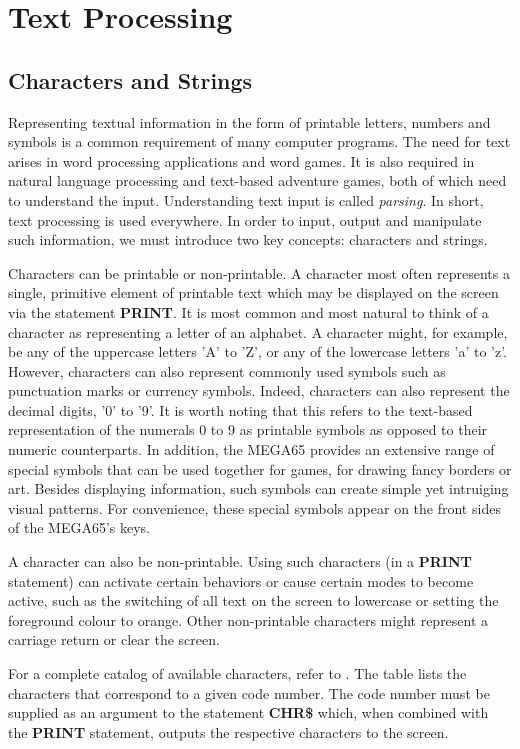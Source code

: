 \chapter{Text Processing}

\section{Characters and Strings}
Representing textual information in the form of printable letters, numbers and symbols is a common requirement of many computer programs. The need for text arises in word processing applications and word games. It is also required in natural language processing and text-based adventure games, both of which need to understand the input. Understanding text input is called {\it parsing}. In short, text processing is used everywhere. In order to input, output and manipulate such information, we must introduce two key concepts: characters and strings.

Characters can be printable or non-printable. A character most often represents a single, primitive element of printable text which may be displayed on the screen via the statement {\bf PRINT}. It is most common and most natural to think of a character as representing a letter of an alphabet. A character might, for example, be any of the uppercase letters 'A' to 'Z', or any of the lowercase letters 'a' to 'z'. However, characters can also represent commonly used symbols such as punctuation marks or currency symbols. Indeed, characters can also represent the decimal digits, '0' to '9'. It is worth noting that this refers to the text-based representation of the numerals 0 to 9 as printable symbols as opposed to their numeric counterparts. In addition, the MEGA65 provides an extensive range of special symbols that can be used together for games, for drawing fancy borders or art. Besides displaying information, such symbols can create simple yet intruiging visual patterns. For convenience, these special symbols appear on the front sides of the MEGA65's keys.

A character can also be non-printable. Using such characters
(in a {\bf PRINT} statement) can activate certain behaviors or cause
certain modes to become active, such as the switching of all text on the
screen to lowercase or setting the foreground colour to orange. Other
non-printable characters might represent a carriage return or clear the screen.

For a complete catalog of available characters, refer to . The table lists the characters that correspond to a given code number. The code number must be supplied as an argument to the statement {\bf CHR\$} which, when combined with the {\bf PRINT} statement, outputs the respective characters to the screen.

